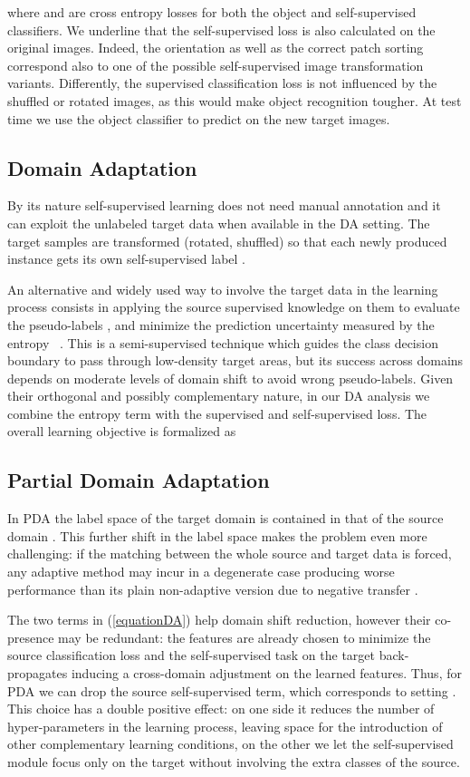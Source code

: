where  and  are cross entropy losses for both the object and self-supervised classifiers. We underline that the self-supervised loss is also calculated on the original images. Indeed, the  orientation as well as the correct patch sorting correspond
also to one of the possible self-supervised image transformation variants. Differently, the supervised classification loss is not influenced by the shuffled or rotated images, as this would make object recognition tougher. At test time we use the object classifier  to predict on the new target images.

\subsection{Domain Adaptation}
By its nature self-supervised learning does not need manual annotation and it can exploit the unlabeled target data  when available in the DA setting.
The target samples are transformed (rotated, shuffled) so that each newly produced instance  gets its own self-supervised label .

{An alternative and widely used way 
to involve the target data in the learning process consists in applying the source supervised knowledge on them to evaluate the pseudo-labels , and minimize the prediction uncertainty measured by the entropy   ~\cite{mancini2018boosting,featurenorm_PDA}. This is a semi-supervised technique which guides the class decision boundary to pass through 
low-density target areas, but its success across domains depends on moderate levels of domain shift to avoid wrong pseudo-labels.
}
{Given their orthogonal and possibly complementary nature, in our DA analysis we combine the entropy term with the supervised and self-supervised loss.}
The overall learning objective is formalized as \vspace{-1mm}


\subsection{Partial Domain Adaptation}
\label{subsec:PDA}
In PDA the label space of the target domain is contained in that of the source domain . This further shift in the label space makes the problem even more challenging: 
if the matching between the whole source and target data is forced, any adaptive method may incur in a degenerate case producing worse performance than its plain non-adaptive version due to negative transfer \cite{Rosenstein05totransfer}. 

The two  terms in (\ref{equationDA}) help domain shift reduction, however their co-presence may be redundant: the features are already chosen to minimize the 
source classification loss and the self-supervised task on the target back-propagates inducing a cross-domain adjustment on the learned features. Thus, for PDA we can drop the source self-supervised term, which corresponds to setting . This choice has a double positive effect: on one side it reduces the number of hyper-parameters in the learning process, leaving space for the introduction of other complementary learning conditions, on the other we let the self-supervised module focus only on the target without involving the extra classes of the source. 

